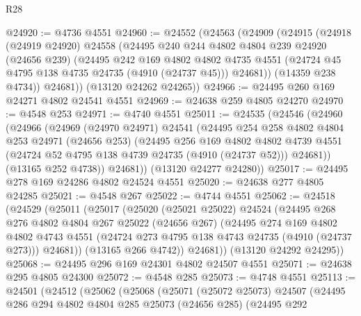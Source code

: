 \begin{lexlean}{R28}
\begin{coremodule}
@24920 := @4736 @4551
@24960 := @24552
    (@24563
      (@24909
        (@24915
          (@24918
            (@24919 @24920)
            @24558
            (@24495
              @240
              @244
              @4802
              @4804
              @239
              @24920
              (@24656 @239)
              (@24495
                @242
                @169
                @4802
                @4802
                @4735
                @4551
                (@24724 @45 @4795 @138 @4735 @24735 (@4910 (@24737 @45)))
                @24681))
            (@14359 @238 @4734))
          @24681))
      (@13120 @24262 @24265))
@24966 := @24495 @260 @169 @24271 @4802 @24541 @4551
@24969 := @24638 @259 @4805 @24270
@24970 := @4548 @253
@24971 := @4740 @4551
@25011 := @24535
    (@24546
      (@24960
        (@24966
          (@24969
            (@24970 @24971)
            @24541
            (@24495
              @254
              @258
              @4802
              @4804
              @253
              @24971
              (@24656 @253)
              (@24495
                @256
                @169
                @4802
                @4802
                @4739
                @4551
                (@24724 @52 @4795 @138 @4739 @24735 (@4910 (@24737 @52)))
                @24681))
            (@13165 @252 @4738))
          @24681))
      (@13120 @24277 @24280))
@25017 := @24495 @278 @169 @24286 @4802 @24524 @4551
@25020 := @24638 @277 @4805 @24285
@25021 := @4548 @267
@25022 := @4744 @4551
@25062 := @24518
    (@24529
      (@25011
        (@25017
          (@25020
            (@25021 @25022)
            @24524
            (@24495
              @268
              @276
              @4802
              @4804
              @267
              @25022
              (@24656 @267)
              (@24495
                @274
                @169
                @4802
                @4802
                @4743
                @4551
                (@24724 @273 @4795 @138 @4743 @24735 (@4910 (@24737 @273)))
                @24681))
            (@13165 @266 @4742))
          @24681))
      (@13120 @24292 @24295))
@25068 := @24495 @296 @169 @24301 @4802 @24507 @4551
@25071 := @24638 @295 @4805 @24300
@25072 := @4548 @285
@25073 := @4748 @4551
@25113 := @24501
    (@24512
      (@25062
        (@25068
          (@25071
            (@25072 @25073)
            @24507
            (@24495
              @286
              @294
              @4802
              @4804
              @285
              @25073
              (@24656 @285)
              (@24495
                @292

\end{coremodule}
\end{lexlean}
